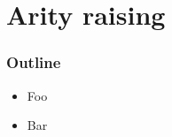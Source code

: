 \section{Arity raising}

\begin{frame}
\frametitle{Outline}

\begin{itemize}
  \item Foo
  \item Bar
\end{itemize}

\end{frame}

